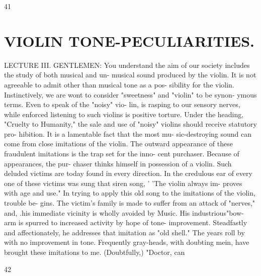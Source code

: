 \documentclass{article}
\begin{document}
41

\section*{VIOLIN TONE-PECULIARITIES.}
LECTURE III. GENTLEMEN: You understand the aim of our society includes the study of both musical and un- musical sound produced by the violin. It is not agreeable to admit other than musical tone as a pos- sibility for the violin. Instinctively, we are wont to consider "sweetness" and "violin" to be synon- ymous terms. Even to speak of the "noisy" vio- lin, is rasping to our sensory nerves, while enforced listening to such violins is positive torture. Under the heading, "Cruelty to Humanity," the sale and use of "noisy" violins should receive statutory pro- hibition. It is a lamentable fact that the most mu- sic-destroying sound can come from close imitations of the violin. The outward appearance of these fraudulent imitations is the trap set for the inno- cent purchaser. Because of appearances, the pur- chaser thinks himself in possession of a violin. Such deluded victims are today found in every direction. In the credulous ear of every one of these victims was sung that siren song, ' 'The violin always im- proves with age and use." In trying to apply this old song to the imitations of the violin, trouble be- gins. The victim's family is made to suffer from an attack of "nerves," and, .his immediate vicinity is wholly avoided by Music. His industrious"bow- arm is spurred to increased activity by hope of tone- improvement. Steadfastly and affectionately, he addresses that imitation as "old shell." The years roll by with no improvement in tone. Frequently gray-heads, with doubting mein, have brought these imitations to me. (Doubtfully,) "Doctor, can

42
\end{document}
